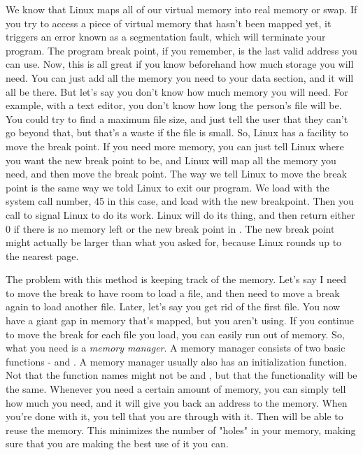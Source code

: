 We know that Linux maps all of our virtual memory into real memory or
swap.  If you try to access a piece of virtual memory that hasn't been mapped yet,
it triggers an error known as a segmentation fault, which will terminate your 
program.  The program break point, if you remember, is the last valid address you
can use.  Now, this is all great if you know beforehand how much storage you will
need.  You can just add all the memory you need to your data section, and it will
all be there.  But let's say you don't know how much memory you will need.  For example,
with a text editor, you don't know how long the person's file will be.  You could try
to find a maximum file size, and just tell the user that they can't go beyond that, but
that's a waste if the file is small.  So, Linux has a facility to move the break point.
If you need more memory, you can just tell Linux where you want the new break point
to be, and Linux will map all the memory you need, and then move the break point.  The
way we tell Linux to move the break point is the same way we told Linux to exit our program.
We load \icode{{\eaxBare}} with the system call number, 45 in this case, and load
\icode{{\ebxBare}} with the new breakpoint.  Then you call 
to signal Linux to do its work.  Linux will do its thing, and then return either 0 if there is no 
memory left or the
new break point in \icode{{\eaxBare}}.  The new break point might actually be larger
than what you asked for, because Linux rounds up to the nearest page.

 

The problem with this method is keeping track of the memory.  Let's say I need to
move the break to have room to load a file, and then need to move a break again to
load another file.  Later, let's say you get rid of the first file.  You now have
a giant gap in memory that's mapped, but you aren't using.  If you continue to 
move the break for each file you load, you can easily run out of memory.  So, what
you need is a \emph{memory manager}.  A memory manager consists of
two basic functions -  and .  A
memory manager usually also has an initialization function.  Not that the function names
might not be  and , but that
the functionality will be the same.
Whenever you need a certain amount of memory, you can simply tell 
how much you need, and it will give you back an address to the memory.  When you're done with it, you tell 
that you are through with it.  Then  will be able to reuse the
memory.  This minimizes the number of "holes" in your memory, making sure that you
are making the best use of it you can.

